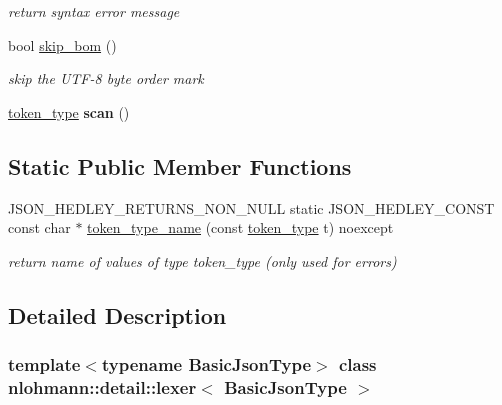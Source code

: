 \begin{DoxyCompactItemize}
\begin{DoxyCompactList}\small\item\em return syntax error message \end{DoxyCompactList}\item 
bool \mbox{\hyperlink{classnlohmann_1_1detail_1_1lexer_a709afd52def2e258dac0b8a67dc4ea26}{skip\+\_\+bom}} ()
\begin{DoxyCompactList}\small\item\em skip the U\+T\+F-\/8 byte order mark \end{DoxyCompactList}\item 
\mbox{\label{classnlohmann_1_1detail_1_1lexer_aac3041cd2b9291e64fee38db422863c9}} 
\mbox{\hyperlink{classnlohmann_1_1detail_1_1lexer_a3f313cdbe187cababfc5e06f0b69b098}{token\+\_\+type}} {\bfseries scan} ()
\end{DoxyCompactItemize}
\subsection*{Static Public Member Functions}
\begin{DoxyCompactItemize}
\item 
\mbox{\label{classnlohmann_1_1detail_1_1lexer_adb831e1f692a45c2281ed3d59ddf1e17}} 
J\+S\+O\+N\+\_\+\+H\+E\+D\+L\+E\+Y\+\_\+\+R\+E\+T\+U\+R\+N\+S\+\_\+\+N\+O\+N\+\_\+\+N\+U\+LL static J\+S\+O\+N\+\_\+\+H\+E\+D\+L\+E\+Y\+\_\+\+C\+O\+N\+ST const char $\ast$ \mbox{\hyperlink{classnlohmann_1_1detail_1_1lexer_adb831e1f692a45c2281ed3d59ddf1e17}{token\+\_\+type\+\_\+name}} (const \mbox{\hyperlink{classnlohmann_1_1detail_1_1lexer_a3f313cdbe187cababfc5e06f0b69b098}{token\+\_\+type}} t) noexcept
\begin{DoxyCompactList}\small\item\em return name of values of type token\+\_\+type (only used for errors) \end{DoxyCompactList}\end{DoxyCompactItemize}


\subsection{Detailed Description}
\subsubsection*{template$<$typename Basic\+Json\+Type$>$\newline
class nlohmann\+::detail\+::lexer$<$ Basic\+Json\+Type $>$}

